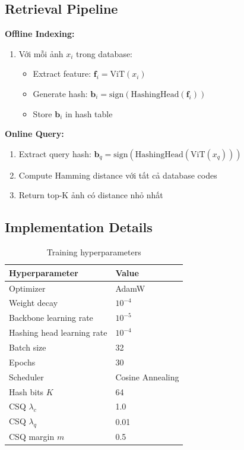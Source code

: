 \documentclass[12pt,a4paper]{article}
\begin{document}
\subsection{Retrieval Pipeline}

\textbf{Offline Indexing:}
\begin{enumerate}
    \item Với mỗi ảnh $x_i$ trong database:
    \begin{itemize}
        \item Extract feature: $\mathbf{f}_i = \text{ViT}(x_i)$
        \item Generate hash: $\mathbf{b}_i = \text{sign}(\text{HashingHead}(\mathbf{f}_i))$
        \item Store $\mathbf{b}_i$ in hash table
    \end{itemize}
\end{enumerate}

\textbf{Online Query:}
\begin{enumerate}
    \item Extract query hash: $\mathbf{b}_q = \text{sign}(\text{HashingHead}(\text{ViT}(x_q)))$
    \item Compute Hamming distance với tất cả database codes
    \item Return top-K ảnh có distance nhỏ nhất
\end{enumerate}

\subsection{Implementation Details}

\begin{table}[H]
\centering
\caption{Training hyperparameters}
\begin{tabular}{ll}
\toprule
\textbf{Hyperparameter} & \textbf{Value} \\
\midrule
Optimizer & AdamW \\
Weight decay & $10^{-4}$ \\
Backbone learning rate & $10^{-5}$ \\
Hashing head learning rate & $10^{-4}$ \\
Batch size & 32 \\
Epochs & 30 \\
Scheduler & Cosine Annealing \\
Hash bits $K$ & 64 \\
CSQ $\lambda_c$ & 1.0 \\
CSQ $\lambda_q$ & 0.01 \\
CSQ margin $m$ & 0.5 \\
\bottomrule
\end{tabular}
\end{table}
\end{document}
